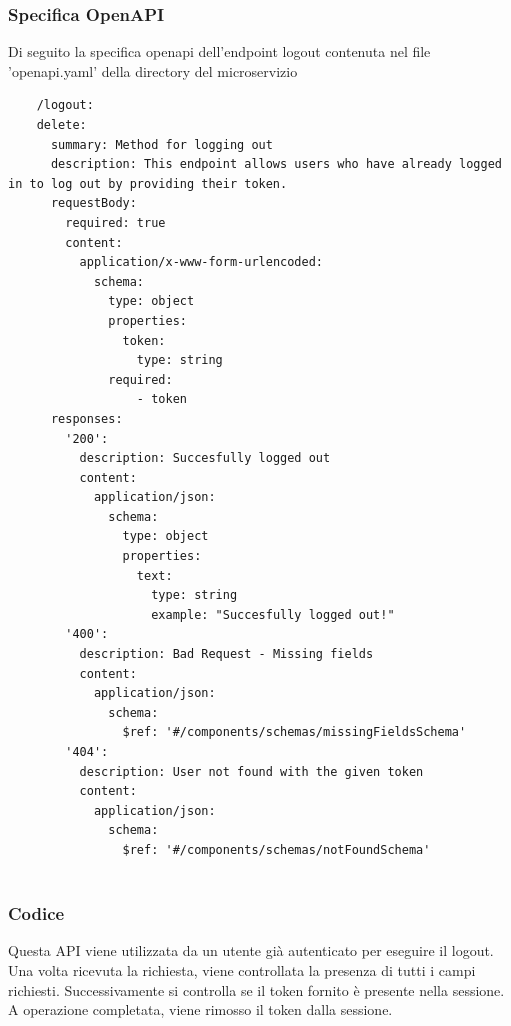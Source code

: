 \documentclass{report}
\begin{document}
\subsubsection*{Specifica OpenAPI}
Di seguito la specifica openapi dell'endpoint logout contenuta nel file 'openapi.yaml' della directory del microservizio
\begin{verbatim}
	/logout:
    delete:
      summary: Method for logging out 
      description: This endpoint allows users who have already logged in to log out by providing their token.
      requestBody:
        required: true
        content:
          application/x-www-form-urlencoded:
            schema:
              type: object
              properties:
                token:
                  type: string
              required:
                  - token
      responses:
        '200':
          description: Succesfully logged out
          content:
            application/json:
              schema:
                type: object
                properties:
                  text:
                    type: string
                    example: "Succesfully logged out!"
        '400':
          description: Bad Request - Missing fields 
          content:
            application/json:
              schema:
                $ref: '#/components/schemas/missingFieldsSchema'
        '404':
          description: User not found with the given token
          content:
            application/json:
              schema:
                $ref: '#/components/schemas/notFoundSchema'
	
\end{verbatim}

\subsubsection*{Codice}
Questa API viene utilizzata da un utente già autenticato per eseguire il logout.
Una volta ricevuta la richiesta, viene controllata la presenza di tutti i campi richiesti.
Successivamente si controlla se il token fornito è presente nella sessione.
A operazione completata, viene rimosso il token dalla sessione.
\end{document}
